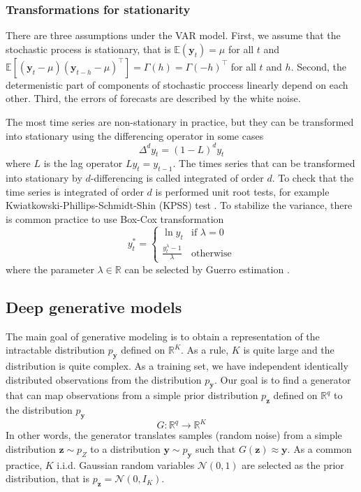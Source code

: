 \documentclass[12pt,a4paper]{article}
\begin{document}
\subsubsection{Transformations for stationarity}

There are three assumptions under the VAR model. First, we assume that the stochastic process is stationary, that is $\mathbb E (\mathbf y_t) = \mu$ for all $t$ and $\mathbb E [(\mathbf y_t - \mu)(\mathbf y_{t-h}-\mu)^\top] = \Gamma(h) = \Gamma(-h)^\top$ for all $t$ and $h$. Second, the determenistic part of components of stochastic proccess linearly depend on each other. Third, the errors of forecasts are described by the white noise.

The most time series are non-stationary in practice, but they can be transformed into stationary using the differencing operator in some cases
$$\Delta^d y_t = (1 - L)^d y_t$$
where $L$ is the lag operator $Ly_t = y_{t-1}$. The times series that can be transformed into stationary by $d$-differencing is called integrated of order $d$. To check that the time series is integrated of order $d$ is performed unit root tests, for example Kwiatkowski-Phillips-Schmidt-Shin (KPSS) test \cite{fpp3}. To stabilize the variance, there is common practice to use Box-Cox transformation
$$y_t^* = \begin{cases}
    \ln y_t & \text{if $\lambda = 0$} \\ 
    \frac{y_t^\lambda - 1}{\lambda} & \text{otherwise}
\end{cases}$$
where the parameter $\lambda \in \mathbb R$ can be selected by Guerro estimation \cite{guerrero93}.

\subsection{Deep generative models} \label{deepgenmodels}

The main goal of generative modeling is to obtain a representation of the intractable distribution $p_\mathbf y$ defined on $\mathbb R^K$. As a rule, $K$ is quite large and the distribution is quite complex. As a training set, we have independent identically distributed observations from the distribution $p_\mathbf y$. Our goal is to find a generator that can map observations from a simple prior distribution $p_\mathbf z$ defined on $\mathbb R^q$ to the distribution $p_\mathbf y$
$$G: \mathbb R^q \to \mathbb R^K$$
In other words, the generator translates samples (random noise) from a simple distribution $\mathbf z \sim p_Z$ to a distribution $\mathbf y \sim p_\mathbf y$ such that $G(\mathbf z) \approx \mathbf y$. As a common practice, $K$ i.i.d. Gaussian random variables $\mathcal N(0, 1)$ are selected as the prior distribution, that is $p_{\mathbf z} = \mathcal N(0, I_K)$.
\end{document}
